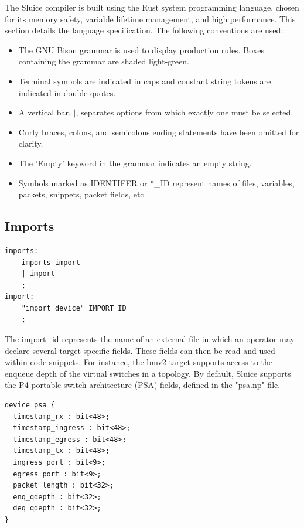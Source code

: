 \documentclass[12pt, oneside]{article}
\begin{document}
The Sluice compiler is built using the Rust system programming language, chosen for its memory safety, variable lifetime management, and high performance. This section details the language specification. The following conventions are used:

\begin{itemize}
  \item The GNU Bison grammar is used to display production rules. Boxes containing the grammar are shaded light-green.
  \item Terminal symbols are indicated in caps and constant string tokens are indicated in double quotes.
  \item A vertical bar, $|$, separates options from which exactly one must be selected.
  \item Curly braces, colons, and semicolons ending statements have been omitted for clarity.
  \item The 'Empty' keyword in the grammar indicates an empty string.
  \item Symbols marked as IDENTIFER or *\_ID represent names of files, variables, packets, snippets, packet fields, etc.
\end{itemize}


\subsection{Imports}
\begin{lstlisting}[basicstyle=\linespread{1.3}\scriptsize,  numberstyle=\tiny, backgroundcolor = \color{teagreen}, frame=tlrb]
imports:
	imports import
	| import
	;
import:
	"import device" IMPORT_ID
	;
\end{lstlisting}

The import\_id represents the name of an external file in which an operator may declare several target-specific fields. These fields can then be read and used within code snippets. For instance, the bmv2 target supports access to the enqueue depth of the virtual switches in a topology. By default, Sluice supports the P4 portable switch architecture (PSA) fields, defined in the "psa.np" file. 

\begin{lstlisting}[basicstyle=\linespread{1.3}\scriptsize, caption=PSA fields]
device psa {
  timestamp_rx : bit<48>;
  timestamp_ingress : bit<48>;
  timestamp_egress : bit<48>;
  timestamp_tx : bit<48>;
  ingress_port : bit<9>;
  egress_port : bit<9>;
  packet_length : bit<32>;
  enq_qdepth : bit<32>;
  deq_qdepth : bit<32>;
}
\end{lstlisting}
\end{document}
